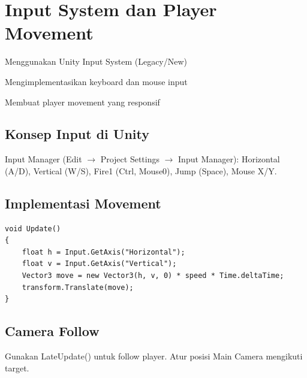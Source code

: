 \section{Input System dan Player Movement}

\begin{learningoutcomes}
\item Menggunakan Unity Input System (Legacy/New)
\item Mengimplementasikan keyboard dan mouse input
\item Membuat player movement yang responsif
\end{learningoutcomes}

\subsection{Konsep Input di Unity}

Input Manager (Edit $\rightarrow$ Project Settings $\rightarrow$ Input Manager): Horizontal (A/D), Vertical (W/S), Fire1 (Ctrl, Mouse0), Jump (Space), Mouse X/Y.

\subsection{Implementasi Movement}

\begin{lstlisting}[language={[Sharp]C}]
void Update()
{
    float h = Input.GetAxis("Horizontal");
    float v = Input.GetAxis("Vertical");
    Vector3 move = new Vector3(h, v, 0) * speed * Time.deltaTime;
    transform.Translate(move);
}
\end{lstlisting}

\subsection{Camera Follow}

Gunakan LateUpdate() untuk follow player. Atur posisi Main Camera mengikuti target.
